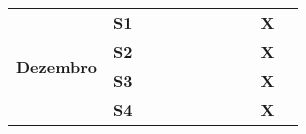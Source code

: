 \begin{table}[]
\begin{tabular}{|clllclllllllllll|}
\multicolumn{4}{|c|}{\multirow{4}{*}{\textbf{Dezembro}}} & \multicolumn{3}{c|}{\textbf{S1}}                      & \multicolumn{1}{l|}{\textbf{}}  & \multicolumn{1}{l|}{\textbf{}}  & \multicolumn{1}{l|}{\textbf{}}  & \multicolumn{1}{l|}{\textbf{}}  & \multicolumn{1}{l|}{\textbf{}}  & \multicolumn{1}{l|}{\textbf{}}  & \multicolumn{1}{l|}{\textbf{}}  & \multicolumn{1}{l|}{\textbf{X}} \\ \cline{5-15} 
\multicolumn{4}{|c|}{}                                   & \multicolumn{3}{c|}{\textbf{S2}}                      & \multicolumn{1}{l|}{\textbf{}}  & \multicolumn{1}{l|}{\textbf{}}  & \multicolumn{1}{l|}{\textbf{}}  & \multicolumn{1}{l|}{\textbf{}}  & \multicolumn{1}{l|}{\textbf{}}  & \multicolumn{1}{l|}{\textbf{}}  & \multicolumn{1}{l|}{\textbf{}}  & \multicolumn{1}{l|}{\textbf{X}}   \\ \cline{5-15} 
\multicolumn{4}{|c|}{}                                   & \multicolumn{3}{c|}{\textbf{S3}}                      & \multicolumn{1}{l|}{\textbf{}}  & \multicolumn{1}{l|}{\textbf{}}  & \multicolumn{1}{l|}{\textbf{}}  & \multicolumn{1}{l|}{\textbf{}}  & \multicolumn{1}{l|}{\textbf{}}  & \multicolumn{1}{l|}{\textbf{}}  & \multicolumn{1}{l|}{\textbf{}}  & \multicolumn{1}{l|}{\textbf{X}}  \\ \cline{5-15} 
\multicolumn{4}{|c|}{}                                   & \multicolumn{3}{c|}{\textbf{S4}}                      & \multicolumn{1}{l|}{\textbf{}}  & \multicolumn{1}{l|}{\textbf{}}  & \multicolumn{1}{l|}{\textbf{}}  & \multicolumn{1}{l|}{\textbf{}}  & \multicolumn{1}{l|}{\textbf{}}  & \multicolumn{1}{l|}{\textbf{}}  & \multicolumn{1}{l|}{\textbf{}}  & \multicolumn{1}{l|}{\textbf{X}}  \\ \hline
\end{tabular}
\end{table}
\centering

